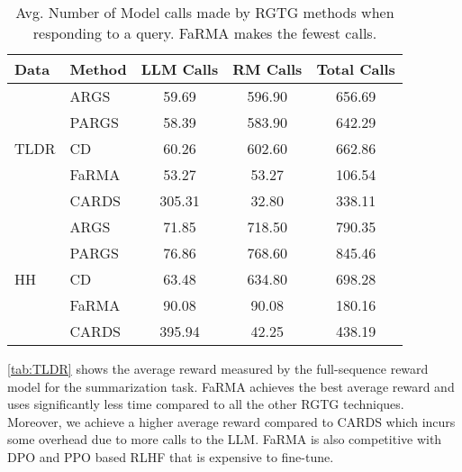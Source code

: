 \begin{table}[ht]
    \centering
    \footnotesize
    \begin{tabular}{l l c c c }
        \toprule
        \textbf{Data} & \textbf{Method} & \textbf{LLM Calls} & \textbf{RM Calls} & \textbf{Total Calls}\\
        \midrule
        \multirow{5}{*}{TLDR} & ARGS & 59.69 & 596.90 &  656.69\\
        & PARGS & 58.39 & 583.90 & 642.29\\
        & CD & 60.26 & 602.60 & 662.86\\
        & FaRMA & 53.27 & 53.27 & 106.54\\
        & CARDS & 305.31 & 32.80 & 338.11\\
        \midrule
        \multirow{5}{*}{HH} & ARGS & 71.85 & 718.50 & 790.35 \\
        & PARGS & 76.86 & 768.60 & 845.46\\
        & CD & 63.48 & 634.80 & 698.28\\
        & FaRMA & 90.08 & 90.08 & 180.16 \\
        & CARDS & 395.94 & 42.25 & 438.19 \\
        \bottomrule
    \end{tabular}
    \caption{Avg. Number of Model calls made by RGTG methods when responding to a query. FaRMA makes the fewest calls.}
    \label{tab:numberOfCalls}
\end{table}

\cref{tab:TLDR} shows the average reward measured by the full-sequence reward model for the summarization task. FaRMA achieves the best average reward and uses significantly less time compared to all the other RGTG techniques. Moreover, we achieve a higher average reward compared to CARDS which incurs some overhead due to more calls to the LLM. FaRMA is also competitive with DPO and PPO based RLHF that is expensive to fine-tune.

